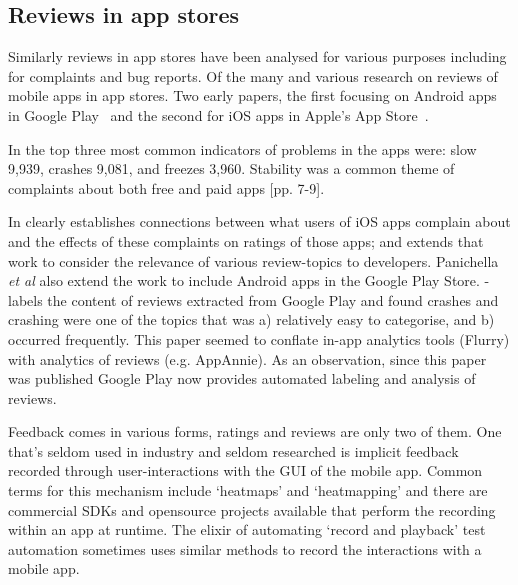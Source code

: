 \subsection{Reviews in app stores}
Similarly reviews in app stores have been analysed for various purposes including for complaints and bug reports. Of the many and various research on reviews of mobile apps in app stores. 
Two early papers, the first focusing on Android apps in Google Play~\citet{fu2013_why_people_hate_your_app_making_sense_of_user_feedback_in_a_mobile_app_store} and the second for iOS apps in Apple's App Store~\citet{khalid2015_what_do_mobile_app_users_complain_about}.

In \citet[p. 5]{fu2013_why_people_hate_your_app_making_sense_of_user_feedback_in_a_mobile_app_store} the top three most common indicators of problems in the apps were: slow 9,939, crashes 9,081, and freezes 3,960. Stability was a common theme of complaints about both free and paid apps [pp. 7-9]. 

In \citet{khalid2015_what_do_mobile_app_users_complain_about} clearly establishes connections between what users of iOS apps complain about and the effects of these complaints on ratings of those apps; and \citet{panichella2015_how_can_i_improve_my_app_classifying_user_reviews_for_sw_maintenance_and_evolution} extends that work to consider the relevance of various review-topics to developers. Panichella \emph{et al} also extend the work to include Android apps in the Google Play Store. \citet{mcilroy2016_analyzing_and_automatically_labelling_the_types_of_user_issues_raised_in_mobile_app_reviews} - labels the content of reviews extracted from Google Play and found crashes and crashing were one of the topics that was a) relatively easy to categorise, and b) occurred frequently. This paper seemed to conflate in-app analytics tools (Flurry) with analytics of reviews (e.g. AppAnnie). As an observation, since this paper was published Google Play now provides automated labeling and analysis of reviews.

Feedback comes in various forms, ratings and reviews are only two of them.  One that's seldom used in industry and seldom researched is implicit feedback recorded through user-interactions with the GUI of the mobile app. Common terms for this mechanism include `heatmaps' and `heatmapping' and there are commercial SDKs and opensource projects available that perform the recording within an app at runtime. The elixir of automating `record and playback' test automation sometimes uses similar methods to record the interactions with a mobile app. 

